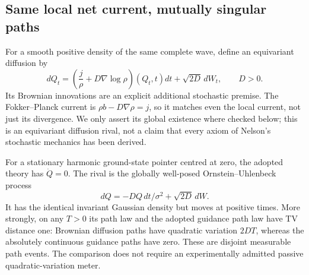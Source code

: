 \documentclass[11pt]{article}
\theoremstyle{definition}\newtheorem{assumption}[theorem]{Constitutive assumption}
\theoremstyle{remark}\newtheorem{remark}[theorem]{Remark}
\begin{document}
\subsection{Same local net current, mutually singular paths}
For a smooth positive density of the same complete wave, define an equivariant diffusion by
\begin{equation}\label{eq:diffusion}
 dQ_t=\left(\frac j\rho+D\nabla\log\rho\right)(Q_t,t)dt
                                   +\sqrt{2D}\,dW_t,
 \qquad D>0.
\end{equation}
Its Brownian innovations are an explicit additional stochastic premise. The Fokker--Planck current is $\rho b-D\nabla\rho=j$, so it matches even the local current, not just its divergence. We only assert its global existence where checked below; this is an equivariant diffusion rival, not a claim that every axiom of Nelson's stochastic mechanics has been derived.

For a stationary harmonic ground-state pointer centred at zero, the adopted theory has $\dot Q=0$. The rival is the globally well-posed Ornstein--Uhlenbeck process
\[
 dQ=-D Q\,dt/\sigma^2+\sqrt{2D}\,dW.
\]
It has the identical invariant Gaussian density but moves at positive times. More strongly, on any $T>0$ its path law and the adopted guidance path law have TV distance one: Brownian diffusion paths have quadratic variation $2DT$, whereas the absolutely continuous guidance paths have zero. These are disjoint measurable path events. The comparison does not require an experimentally admitted passive quadratic-variation meter.
\end{document}
